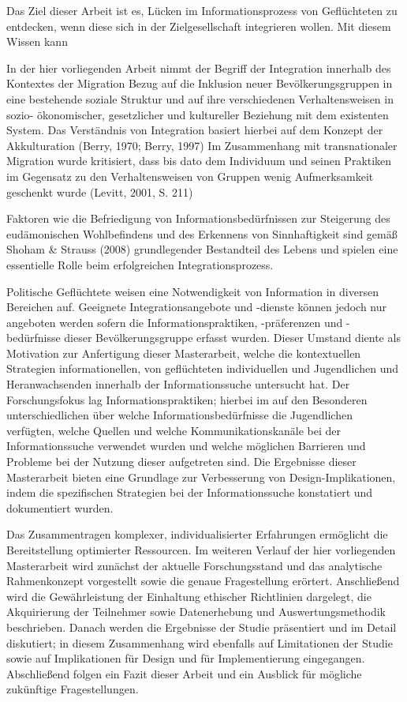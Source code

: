 Das Ziel dieser Arbeit ist es, Lücken im Informationsprozess von Geflüchteten zu entdecken, wenn diese sich in der Zielgesellschaft integrieren wollen.
Mit diesem Wissen kann 



In der hier vorliegenden Arbeit nimmt der Begriff der Integration innerhalb des Kontextes der Migration
Bezug auf die Inklusion neuer Bevölkerungsgruppen in eine bestehende
soziale Struktur und auf ihre verschiedenen Verhaltensweisen in sozio-
ökonomischer, gesetzlicher und kultureller Beziehung mit dem existenten System. Das Verständnis von Integration basiert hierbei auf
dem Konzept der Akkulturation (Berry, 1970; Berry, 1997) Im
Zusammenhang mit transnationaler Migration wurde kritisiert, dass bis
dato dem Individuum und seinen Praktiken im Gegensatz zu den
Verhaltensweisen von Gruppen wenig Aufmerksamkeit geschenkt wurde
(Levitt, 2001, S. 211)

Faktoren wie die Befriedigung von Informationsbedürfnissen zur
Steigerung des eudämonischen Wohlbefindens und des Erkennens von
Sinnhaftigkeit sind gemäß Shoham \& Strauss (2008) grundlegender
Bestandteil des Lebens und spielen eine essentielle Rolle beim
erfolgreichen Integrationsprozess.




Politische Geflüchtete weisen eine Notwendigkeit von Information in
diversen Bereichen auf. Geeignete Integrationsangebote und -dienste
können jedoch nur angeboten werden sofern die Informationspraktiken,
-präferenzen und -bedürfnisse dieser Bevölkerungsgruppe erfasst
wurden. Dieser Umstand diente als Motivation zur Anfertigung dieser
Masterarbeit, welche die kontextuellen Strategien informationellen,
von geflüchteten individuellen und Jugendlichen und Heranwachsenden innerhalb der Informationssuche untersucht hat. Der Forschungsfokus lag Informationspraktiken;
hierbei im auf  den Besonderen unterschiedlichen über welche Informationsbedürfnisse die Jugendlichen verfügten, welche Quellen und welche Kommunikationskanäle bei der Informationssuche verwendet wurden und welche möglichen Barrieren und Probleme bei der Nutzung
dieser aufgetreten sind. Die Ergebnisse dieser Masterarbeit bieten eine
Grundlage zur Verbesserung von Design-Implikationen, indem die
spezifischen Strategien bei der Informationssuche konstatiert und
dokumentiert wurden.


Das Zusammentragen komplexer,
individualisierter Erfahrungen ermöglicht die Bereitstellung optimierter
Ressourcen. Im weiteren Verlauf der hier vorliegenden Masterarbeit wird zunächst
der aktuelle Forschungsstand und das analytische Rahmenkonzept
vorgestellt sowie die genaue Fragestellung erörtert. Anschließend wird
die Gewährleistung der Einhaltung ethischer Richtlinien dargelegt, die
Akquirierung der Teilnehmer sowie Datenerhebung und
Auswertungsmethodik beschrieben. Danach werden die Ergebnisse der
Studie präsentiert und im Detail diskutiert; in diesem Zusammenhang
wird ebenfalls auf Limitationen der Studie sowie auf Implikationen für
Design und für Implementierung eingegangen. Abschließend folgen ein
Fazit dieser Arbeit und ein Ausblick für mögliche zukünftige
Fragestellungen.

